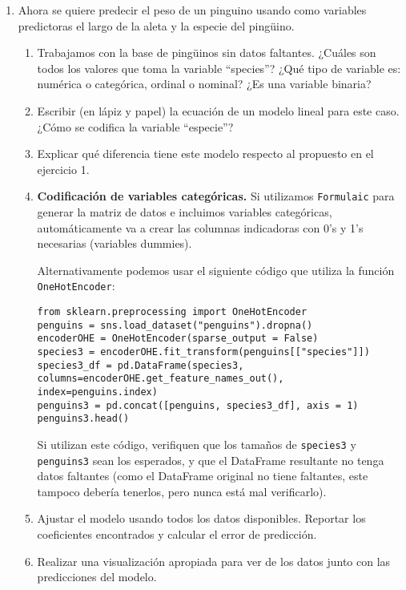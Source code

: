 \documentclass[a4paper,11pt]{article}
\theoremstyle{definition}
\begin{document}
\begin{enumerate}
\item Ahora se quiere predecir el peso de un pinguino usando como variables predictoras el largo de la aleta y la especie del ping\"uino.
\begin{enumerate}
\item Trabajamos con la base de ping\"uinos sin datos faltantes. ¿Cu\'ales son todos los valores que toma la variable ``species''? ¿Qu\'e tipo de variable es: numérica o categórica, ordinal o nominal? ¿Es una variable binaria?
\item Escribir (en lápiz y papel) la ecuación de un modelo lineal para este caso. ¿Cómo se codifica la variable “especie”?
\item Explicar qué diferencia tiene este modelo respecto al propuesto en el ejercicio 1.
\item \textbf{Codificación de variables categóricas.}  Si utilizamos \lstinline{Formulaic} para generar la matriz de datos e incluimos variables categóricas, automáticamente va a crear las columnas indicadoras con 0's y 1's necesarias (variables dummies).
    
    Alternativamente podemos usar el siguiente código que utiliza la función \lstinline{OneHotEncoder}:
\begin{lstlisting}
from sklearn.preprocessing import OneHotEncoder
penguins = sns.load_dataset("penguins").dropna()
encoderOHE = OneHotEncoder(sparse_output = False)
species3 = encoderOHE.fit_transform(penguins[["species"]])
species3_df = pd.DataFrame(species3, columns=encoderOHE.get_feature_names_out(), index=penguins.index)
penguins3 = pd.concat([penguins, species3_df], axis = 1)
penguins3.head()
\end{lstlisting}

Si utilizan este código, verifiquen que los tama\~nos de \lstinline{species3} y \lstinline{penguins3} sean los esperados, y que el DataFrame resultante no tenga datos faltantes (como el DataFrame original no tiene faltantes, este tampoco debería tenerlos, pero nunca está mal verificarlo).

\item Ajustar el modelo usando todos los datos disponibles. Reportar los coeficientes encontrados y calcular el error de predicción.
\item Realizar una visualización apropiada para ver de los datos junto con las predicciones del modelo.
\end{enumerate}

\end{enumerate}
\end{document}

